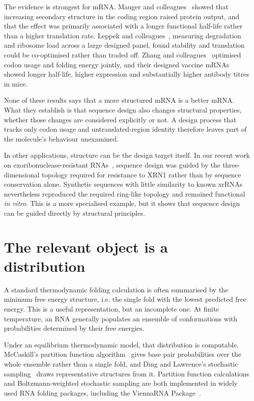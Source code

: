 The evidence is strongest for mRNA. Mauger and colleagues~\cite{mauger2019}
showed that increasing secondary structure in the coding region
raised protein output, and that the effect was primarily associated with a longer
functional half-life rather than a higher translation rate. Leppek and
colleagues~\cite{leppek2022},
measuring degradation and ribosome load across a large designed panel, found
stability and translation could be co-optimised rather than traded off. Zhang and
colleagues~\cite{zhang2023} optimised codon usage and folding energy
jointly, and their designed vaccine mRNAs showed longer half-life, higher
expression and substantially higher antibody titres in mice.

None of these results says that a more structured mRNA is a better mRNA.
What they establish is that sequence design also changes structural properties,
whether those changes are considered explicitly or not. A design process that
tracks only codon usage and untranslated-region identity therefore leaves part
of the molecule's behaviour unexamined.

In other applications, structure can be the design target itself. In our recent
work on exoribonuclease-resistant RNAs~\cite{walter2026}, sequence design was
guided by the three-dimensional topology required for resistance to XRN1 rather
than by sequence conservation alone. Synthetic sequences with little similarity
to known xrRNAs nevertheless reproduced the required ring-like topology and
remained functional \emph{in vitro}. This is a more specialised example, but it
shows that sequence design can be guided directly by structural principles.

\section{The relevant object is a distribution}

A standard thermodynamic folding calculation is often summarised by the minimum
free energy structure, i.e. the single fold with the lowest predicted free energy.
This is a useful representation, but an incomplete one. At finite temperature,
an RNA generally populates an ensemble of conformations with probabilities
determined by their free energies.

Under an equilibrium thermodynamic model, that distribution is computable.
McCaskill's partition function algorithm~\cite{mccaskill1990} gives base pair
probabilities over the whole ensemble rather than a single fold, and Ding and
Lawrence's stochastic sampling~\cite{ding2003} draws representative structures
from it. Partition function calculations and Boltzmann-weighted stochastic
sampling are both implemented in widely used RNA folding packages, including the
ViennaRNA Package~\cite{viennarna2011}.

